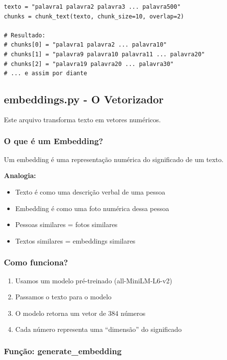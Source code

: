 \documentclass[12pt,a4paper]{article}
\begin{document}
\begin{lstlisting}
texto = "palavra1 palavra2 palavra3 ... palavra500"
chunks = chunk_text(texto, chunk_size=10, overlap=2)

# Resultado:
# chunks[0] = "palavra1 palavra2 ... palavra10"
# chunks[1] = "palavra9 palavra10 palavra11 ... palavra20"
# chunks[2] = "palavra19 palavra20 ... palavra30"
# ... e assim por diante
\end{lstlisting}

\subsection{embeddings.py - O Vetorizador}

Este arquivo transforma texto em vetores numéricos.

\subsubsection{O que é um Embedding?}

Um embedding é uma representação numérica do significado de um texto.

\textbf{Analogia:}
\begin{itemize}
    \item Texto é como uma descrição verbal de uma pessoa
    \item Embedding é como uma foto numérica dessa pessoa
    \item Pessoas similares = fotos similares
    \item Textos similares = embeddings similares
\end{itemize}

\subsubsection{Como funciona?}

\begin{enumerate}
    \item Usamos um modelo pré-treinado (all-MiniLM-L6-v2)
    \item Passamos o texto para o modelo
    \item O modelo retorna um vetor de 384 números
    \item Cada número representa uma ``dimensão'' do significado
\end{enumerate}

\subsubsection{Função: generate\_embedding}
\end{document}
